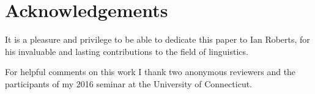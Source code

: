 \documentclass[output=paper]{langsci/langscibook}
\begin{document}
\printchapterglossary{}

\section*{Acknowledgements}

It is a pleasure and privilege to be able to dedicate this paper to Ian
Roberts, for his invaluable and lasting contributions to the field of
linguistics.

For helpful comments on this work I thank two anonymous reviewers and the
participants of my 2016 seminar at the University of Connecticut.

{\sloppy\printbibliography[heading=subbibliography,notkeyword=this]}
\end{document}
